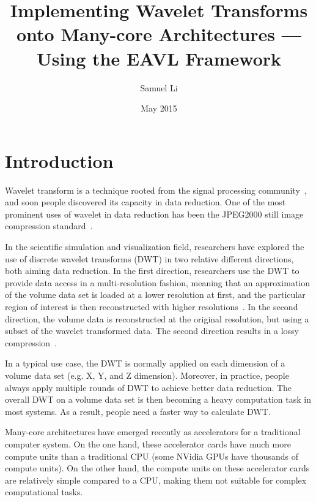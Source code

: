 \documentclass{article}
\title{Implementing Wavelet Transforms onto Many-core Architectures ---
        Using the EAVL Framework}
\author{Samuel Li}
\date{May 2015}
\begin{document}
\maketitle


\section{Introduction}
\label{sec:intro}
%
Wavelet transform is a technique rooted from the signal processing 
community~\cite{daubechies1990wavelet, mallat1999wavelet},
and soon people discovered its capacity in data reduction.
%
One of the most prominent uses of wavelet in data reduction has been
the JPEG2000 still image compression
standard~\cite{adams2001jpeg,usevitch2001tutorial}. 

In the scientific simulation and visualization field, researchers have
explored the use of discrete wavelet transforms (DWT) in two 
relative different directions, both aiming data reduction.
%
In the first direction, researchers use the DWT to provide data access
in a multi-resolution fashion, meaning that an approximation of the volume data
set is loaded at a lower resolution at first, and the particular region of interest
is then reconstructed with higher resolutions~\cite{mallat1989theory,
kanai1998digital, baldwin2003multi}.
%
In the second direction, the volume data is reconstructed at the 
original resolution, but using a subset of the wavelet transformed 
data.
%
The second direction results in a lossy compression~\cite{bethel2012high,
norton2012vapor}.

In a typical use case, the DWT is normally applied on each dimension of a
volume data set (e.g. X, Y, and Z dimension). 
%
Moreover, in practice, people always apply multiple rounds of DWT to achieve better
data reduction. 
%
The overall DWT on a volume data set is then becoming a heavy computation
task in most systems.
%
As a result, people need a faster way to calculate DWT. 

Many-core architectures have emerged recently as accelerators for a 
traditional computer system.
%
On the one hand, these accelerator cards have much more compute units 
than a traditional CPU (some NVidia GPUs have thousands of compute units).
%
On the other hand, the compute units on these accelerator cards are 
relatively simple compared to a CPU, making them not suitable for complex 
computational tasks.
\end{document}
